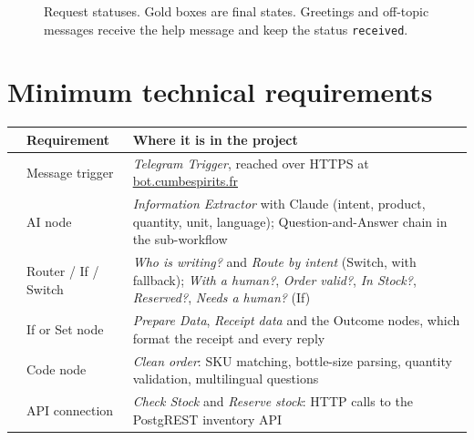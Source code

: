 \documentclass[11pt,a4paper]{article}
\newcommand{\done}{\textcolor{salva}{\checkmark}}
\newcommand{\nd}[1]{\emph{#1}}             %
\newcommand{\st}[1]{\texttt{#1}}           %
\begin{document}
\begin{minipage}{\linewidth}
\begin{figure}[htbp]
\caption{Request statuses. Gold boxes are final states. Greetings and off-topic messages receive
the help message and keep the status \st{received}.}
\label{fig:lifecycle}
\end{figure}

\section{Minimum technical requirements}
\par\noindent\begin{minipage}{\linewidth}
\centering\small
\renewcommand{\arraystretch}{1.3}
\begin{tabularx}{\linewidth}{@{}c l L@{}}
  \toprule
   & \textbf{Requirement} & \textbf{Where it is in the project} \\
  \midrule
  \done & Message trigger & \nd{Telegram Trigger}, reached over HTTPS at \url{bot.cumbespirits.fr} \\
  \done & AI node & \nd{Information Extractor} with Claude (intent, product, quantity, unit,
                     language); Question-and-Answer chain in the sub-workflow \\
  \done & Router / If / Switch & \nd{Who is writing?} and \nd{Route by intent} (Switch, with
                                 fallback); \nd{With a human?}, \nd{Order valid?},
                                 \nd{In Stock?}, \nd{Reserved?}, \nd{Needs a human?} (If) \\
  \done & If or Set node & \nd{Prepare Data}, \nd{Receipt data} and the Outcome nodes, which
                           format the receipt and every reply \\
  \done & Code node & \nd{Clean order}: SKU matching, bottle-size parsing, quantity validation,
                      multilingual questions \\
  \done & API connection & \nd{Check Stock} and \nd{Reserve stock}: HTTP calls to the PostgREST
                           inventory API \\

\end{tabularx}
\end{minipage}
\end{minipage}
\end{document}
